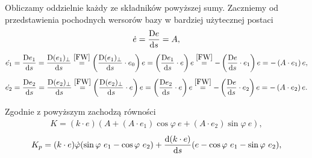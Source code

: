 Obliczamy oddzielnie każdy ze składników powyższej sumy.
Zaczniemy od przedstawienia pochodnych wersorów bazy w bardziej
użytecznej postaci 
\begin{align*}
\dot{e}= \frac{\text{D} e}{\text{d} s} = A,
\end{align*}
\begin{align*}
\dot{e_1}= \frac{\text{D} e_1 }{\text{d} s} = \frac{\text{D} (e_1)_\perp }{\text{d} s} 
\stackrel{\eqref{FW}}{=} 
\left(\frac{\text{D} (e_1)_\perp }{\text{d} s}\cdot e_0\right)e 
= \left(\frac{\text{D} e_1 }{\text{d} s}\cdot e\right)e 
\stackrel{\eqref{FW}}{=} 
 - \left(\frac{\text{D} e }{\text{d} s}\cdot e_1\right)e
= - \left(A\cdot e_1\right)e,
\end{align*}
\begin{align*}
\dot{e_2}= \frac{\text{D} e_2 }{\text{d} s} = \frac{\text{D} (e_2)_\perp }{\text{d} s} 
\stackrel{\eqref{FW}}{=} 
\left(\frac{\text{D} (e_2)_\perp }{\text{d} s}\cdot e\right)e
= \left(\frac{\text{D} e_2 }{\text{d} s}\cdot e\right)e 
\stackrel{\eqref{FW}}{=} 
 - \left(\frac{\text{D} e }{\text{d} s}\cdot e_2\right)e
= - \left(A\cdot e_2\right)e.
\end{align*}

Zgodnie z powyższym zachodzą równości
\begin{align*}
K= (k\cdot e) (A + \left(A\cdot e_1\right)\cos\varphi\ e+ 
\left(A\cdot e_2\right)\sin\varphi\ e ),
\end{align*}
\begin{align*}
K_p= (k\cdot e) \dot{\varphi} ( \sin\varphi\ e_1 - \cos\varphi\ e_2  ) + 
\frac{\text{d}(k\cdot e)}{\text{d} s} (e-\cos\varphi\ e_1 - \sin\varphi\ e_2) ,
\end{align*}

